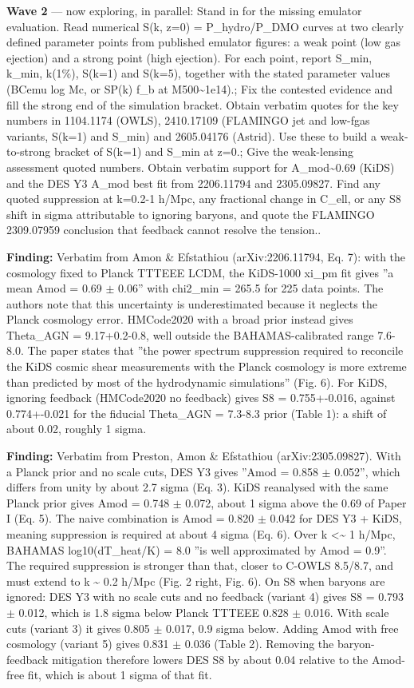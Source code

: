 \documentclass[11pt,a4paper]{article}
\begin{document}
\textbf{Wave 2} --- now exploring, in parallel: Stand in for the missing emulator evaluation. Read numerical S(k, z=0) = P\_hydro/P\_DMO curves at two clearly defined parameter points from published emulator figures: a weak point (low gas ejection) and a strong point (high ejection). For each point, report S\_min, k\_min, k(1\%), S(k=1) and S(k=5), together with the stated parameter values (BCemu log Mc, or SP(k) f\_b at M500\textasciitilde{}1e14).; Fix the contested evidence and fill the strong end of the simulation bracket. Obtain verbatim quotes for the key numbers in 1104.1174 (OWLS), 2410.17109 (FLAMINGO jet and low-fgas variants, S(k=1) and S\_min) and 2605.04176 (Astrid). Use these to build a weak-to-strong bracket of S(k=1) and S\_min at z=0.; Give the weak-lensing assessment quoted numbers. Obtain verbatim support for A\_mod\textasciitilde{}0.69 (KiDS) and the DES Y3 A\_mod best fit from 2206.11794 and 2305.09827. Find any quoted suppression at k=0.2-1 h/Mpc, any fractional change in C\_ell, or any S8 shift in sigma attributable to ignoring baryons, and quote the FLAMINGO 2309.07959 conclusion that feedback cannot resolve the tension..

\textbf{Finding:} Verbatim from Amon \& Efstathiou (arXiv:2206.11794, Eq. 7): with the cosmology fixed to Planck TTTEEE LCDM, the KiDS-1000 xi\_pm fit gives ''a mean Amod = 0.69 $\pm$ 0.06'' with chi2\_min = 265.5 for 225 data points. The authors note that this uncertainty is underestimated because it neglects the Planck cosmology error. HMCode2020 with a broad prior instead gives Theta\_AGN = 9.17+0.2-0.8, well outside the BAHAMAS-calibrated range 7.6-8.0. The paper states that ''the power spectrum suppression required to reconcile the KiDS cosmic shear measurements with the Planck cosmology is more extreme than predicted by most of the hydrodynamic simulations'' (Fig. 6). For KiDS, ignoring feedback (HMCode2020 no feedback) gives S8 = 0.755+-0.016, against 0.774+-0.021 for the fiducial Theta\_AGN = 7.3-8.3 prior (Table 1): a shift of about 0.02, roughly 1 sigma.

\textbf{Finding:} Verbatim from Preston, Amon \& Efstathiou (arXiv:2305.09827). With a Planck prior and no scale cuts, DES Y3 gives ''Amod = 0.858 $\pm$ 0.052'', which differs from unity by about 2.7 sigma (Eq. 3). KiDS reanalysed with the same Planck prior gives Amod = 0.748 $\pm$ 0.072, about 1 sigma above the 0.69 of Paper I (Eq. 5). The naive combination is Amod = 0.820 $\pm$ 0.042 for DES Y3 + KiDS, meaning suppression is required at about 4 sigma (Eq. 6). Over k \textless{}\textasciitilde{} 1 h/Mpc, BAHAMAS log10(dT\_heat/K) = 8.0 ''is well approximated by Amod = 0.9''. The required suppression is stronger than that, closer to C-OWLS 8.5/8.7, and must extend to k \textasciitilde{} 0.2 h/Mpc (Fig. 2 right, Fig. 6). On S8 when baryons are ignored: DES Y3 with no scale cuts and no feedback (variant 4) gives S8 = 0.793 $\pm$ 0.012, which is 1.8 sigma below Planck TTTEEE 0.828 $\pm$ 0.016. With scale cuts (variant 3) it gives 0.805 $\pm$ 0.017, 0.9 sigma below. Adding Amod with free cosmology (variant 5) gives 0.831 $\pm$ 0.036 (Table 2). Removing the baryon-feedback mitigation therefore lowers DES S8 by about 0.04 relative to the Amod-free fit, which is about 1 sigma of that fit.
\end{document}
